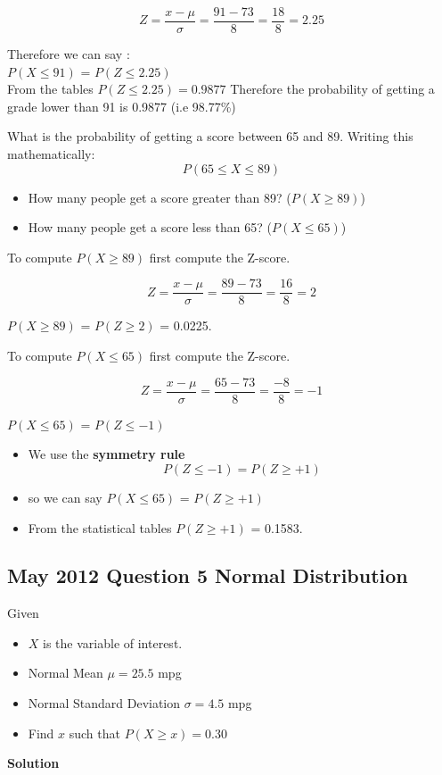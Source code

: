 ﻿\documentclass[]{report}
\begin{document}
\[ Z = \frac{x- \mu}{ \sigma} = \frac{91 - 73}{8} =\frac{18}{8} = 2.25\]

Therefore we can say :\\ $P(X \leq 91)$ = $P(Z \leq 2.25)$ \\


From the tables $P(Z \leq 2.25) = 0.9877$
Therefore the probability of getting a grade lower than 91 is 0.9877 (i.e 98.77\%)


What is the probability of getting a score between 65 and 89.
Writing this mathematically:
\[ P(65 \leq X \leq 89) \]

\begin{itemize}
	\item How many people get a score greater than 89? ($P(X\geq 89)$)
	\item How many people get a score less than 65? ($P(X\leq 65)$)
\end{itemize}

To compute $P(X \geq 89)$ first compute the Z-score.

\[ Z = \frac{x - \mu}{\sigma} = \frac{89 - 73}{8} =\frac{16}{8} = 2 \]

$P(X \geq 89)$ = $P(Z \geq 2)$ = 0.0225.

To compute $P(X \leq 65)$ first compute the Z-score.

\[ Z = \frac{x - \mu}{\sigma} = \frac{65 - 73}{8} =\frac{-8}{8} = -1 \]

$P(X \leq 65)$ = $P(Z \leq -1)$ 

\begin{itemize}
	\item We use the \textbf{symmetry rule}
	\[ P(Z \leq -1) = P(Z \geq +1) \]
	\item so we can say $P(X \leq 65)$ = $P(Z \geq +1)$ 
	\item From the statistical tables $P(Z \geq +1)$ = 0.1583.
\end{itemize}


\subsection{May 2012 Question 5 Normal Distribution }
Given
\begin{itemize}
	\item $X$ is the variable of interest.
	\item Normal Mean $\mu =25.5$ mpg
	\item Normal Standard Deviation $\sigma =4.5$ mpg
\end{itemize}
\begin{itemize}
	\item Find $x$ such that $P(X \geq x) = 0.30$
\end{itemize}
\noindent \textbf{Solution}
\end{document}
